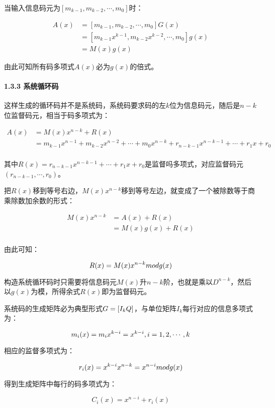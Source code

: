\documentclass[
]{article}
\begin{document}
当输入信息码元为$[m_{k-1},m_{k-2},\cdots,m_0]$时：

\begin{align}
A(x)&=[m_{k-1},m_{k-2},\cdots,m_0]G(x)\\
    &=[m_{k-1}x^{k-1},m_{k-2}x^{k-2},\cdots,m_0]g(x)\\
    &=M(x)g(x)
\end{align}

由此可知所有码多项式$A(x)$必为$g(x)$的倍式。

\hypertarget{header-n61}{%
\paragraph{1.3.3 系统循环码}\label{header-n61}}

这样生成的循环码并不是系统码，系统码要求码的左$k$位为信息码元，随后是$n-k$位监督码元，相当于码多项式为：

\begin{align}
A(x)&=M(x)x^{n-k}+R(x)\\
    &=m_{k-1}x^{n-1}+m_{k-2}x^{n-2}+\cdots+m_0x^{n-k}+r_{n-k-1}x^{n-k-1}+\cdots+r_1x+r_0\\
\end{align}

其中$R(x)=r_{n-k-1}x^{n-k-1}+\cdots+r_1x+r_0$是监督吗多项式，对应监督码元$(r_{n-k-1},\cdots,r_{0})$。

把$R(x)$移到等号右边，$M(x)x^{n-k}$移到等号左边，就变成了一个被除数等于商乘除数加余数的形式：

\begin{align}
M(x)x^{n-k}&=A(x)+R(x)\\
    	&=M(x)g(x)+R(x)\\
\end{align}

由此可知：

$$
R(x)=M(x)x^{n-k} \space mod \space g(x)
$$

构造系统循环码时只需要将信息码元$M(x)$升$n-k$阶，也就是乘以$D^{n-k}$，然后以$g(x)$为模，所得余式$R(x)$即为监督码元。

系统码的生成矩阵必为典型形式$G=[I_k \space Q]$，与单位矩阵$I_k$每行对应的信息多项式为：

$$
m_i(x)=m_ix^{k-i}=x^{k-i},\space i=1,2,\cdots,k
$$

相应的监督多项式为：

$$
r_i(x)=x^{k-i}x^{n-k}=x^{n-i}\space mod \space g(x)
$$

得到生成矩阵中每行的码多项式为：

$$
C_i(x)=x^{n-i}+r_i(x)
$$
\end{document}
